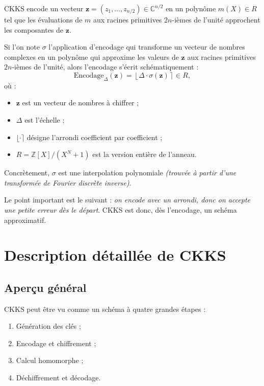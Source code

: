 \begin{definition}
CKKS encode un vecteur $\mathbf{z} = (z_1, \ldots, z_{n/2}) \in \mathbb{C}^{n/2}$
en un polynôme $m(X) \in R$ tel que les évaluations de $m$ aux racines
primitives $2n$-ièmes de l'unité approchent les composantes de $\mathbf{z}$.
\end{definition}

Si l'on note $\sigma$ l'application d'encodage qui transforme un vecteur de nombres complexes en un polynôme qui approxime les valeurs de $\mathbf{z}$ aux racines primitives $2n$-ièmes de l'unité, alors l'encodage s'écrit schématiquement :
\[
\mathrm{Encodage}_\Delta(\mathbf{z})
=
\left\lfloor \Delta \cdot \sigma(\mathbf{z}) \right\rceil \in R,
\]
où :
\begin{itemize}[leftmargin=2em]
  \item $\mathbf{z}$ est un vecteur de nombres à chiffrer ;
  \item $\Delta$ est l'échelle ;
  \item $\lfloor \cdot \rceil$ désigne l'arrondi coefficient par coefficient ;
  \item $R=\mathbb{Z}[X]/(X^N+1)$ est la version entière de l'anneau.
\end{itemize}

Concrètement, $\sigma$ est une interpolation polynomiale \emph{(trouvée à partir d'une transformée de Fourier discrète inverse)}.

Le point important est le suivant : \emph{on encode avec un arrondi, donc on accepte une petite erreur dès le départ}. CKKS est donc, dès l'encodage, un schéma approximatif.

\section{Description détaillée de CKKS}

\subsection{Aperçu général}

CKKS peut être vu comme un schéma à quatre grandes étapes :
\begin{enumerate}[leftmargin=2em]
  \item Génération des clés ;
  \item Encodage et chiffrement ;
  \item Calcul homomorphe ;
  \item Déchiffrement et décodage.
\end{enumerate}

